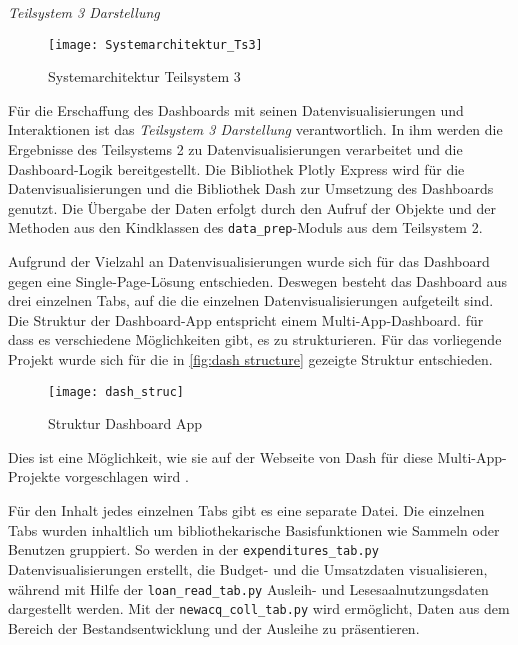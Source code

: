     \noindent
    \textit{Teilsystem 3 Darstellung}\\

    \begin{figure}[H]
        \centering
            \texttt{[image: Systemarchitektur\_Ts3]}
            \caption{Systemarchitektur Teilsystem 3}
            \label{fig:Systemarchitektur Teilsystem 3}
    \end{figure}

    Für die Erschaffung des Dashboards mit seinen Datenvisualisierungen und Interaktionen ist das \textit{Teilsystem 3 Darstellung} verantwortlich.
    In ihm werden die Ergebnisse des Teilsystems 2 zu Datenvisualisierungen verarbeitet und die Dashboard-Logik bereitgestellt.
    Die Bibliothek Plotly Express wird für die Datenvisualisierungen und die Bibliothek Dash zur Umsetzung des Dashboards genutzt. 
    Die Übergabe der Daten erfolgt durch den Aufruf der Objekte und der Methoden aus den Kindklassen des \texttt{data\_prep}-Moduls aus dem Teilsystem 2.
    
    Aufgrund der Vielzahl an Datenvisualisierungen wurde sich für das Dashboard gegen eine Single-Page-Lösung entschieden. Deswegen besteht das Dashboard
    aus drei einzelnen Tabs, auf die die einzelnen Datenvisualisierungen aufgeteilt sind. Die Struktur der Dashboard-App entspricht einem Multi-App-Dashboard.
    für dass es verschiedene Möglichkeiten gibt, es zu strukturieren.
    Für das vorliegende Projekt wurde sich für die in 
    \autoref{fig:dash structure} gezeigte Struktur entschieden.

    \begin{figure}[H]
        \centering
            \texttt{[image: dash\_struc]}
            \caption{Struktur Dashboard App}
            \label{fig:dash structure}
    \end{figure}
    
    Dies ist eine Möglichkeit, wie sie auf der Webseite von Dash für diese Multi-App-Projekte vorgeschlagen wird \cite[vgl.][]{plotly_url_2021}.
    
    Für den Inhalt jedes einzelnen Tabs gibt es eine separate Datei.
    Die einzelnen Tabs wurden inhaltlich um bibliothekarische Basisfunktionen wie Sammeln oder Benutzen gruppiert. So werden in der \texttt{expenditures\_tab.py}
    Datenvisualisierungen erstellt, die Budget- und die Umsatzdaten visualisieren, während mit Hilfe der \texttt{loan\_read\_tab.py}
    Ausleih- und Lesesaalnutzungsdaten dargestellt werden. Mit der \texttt{newacq\_coll\_tab.py} wird ermöglicht, Daten aus dem Bereich der Bestandsentwicklung und der 
    Ausleihe zu präsentieren.

